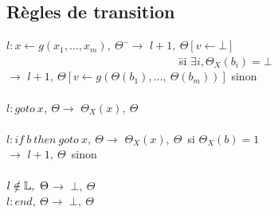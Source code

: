 \subsection{Règles de transition}
\begin{tabbing}
\textlangle$l:x\leftarrow g(x_1, ..., x_m),\ \Theta$\textrangle\ \=$ \longrightarrow $ \textlangle$l+1,\ \Theta[v\leftarrow\bot]$\textrangle~~~~~~~~~~~~~~~~~~~~~~~~~~~~~~~\=si $\exists i, \Theta_X(b_i)=\bot$\\
                                                                   \>$ \longrightarrow $ \textlangle$l+1,\ \Theta[v\leftarrow g(\Theta(b_1),...,\ \Theta(b_m))]$\textrangle \> sinon\\ \\

\textlangle$l:goto\ x,\ \Theta$\textrangle\>$\longrightarrow $ \textlangle$\Theta_X(x),\ \Theta$\textrangle\> \\ \\%


 \textlangle$l:if\ b\ then\ goto\ x,\ \Theta$\textrangle\>$ \longrightarrow $ \textlangle$\Theta_X(x),\ \Theta$\textrangle\ \>si $\Theta_X(b)=1$\\
									    \>$ \longrightarrow $ \textlangle$ l+1,\ \Theta$\textrangle\ \>sinon\\ \\

\textlangle$l\notin\BL,\ \Theta$\textrangle\>$ \longrightarrow $ \textlangle$\bot,\ \Theta$\textrangle\\
\textlangle$l:end,\ \Theta$\textrangle\>$ \longrightarrow $ \textlangle$\bot,\ \Theta$\textrangle
\end{tabbing}
